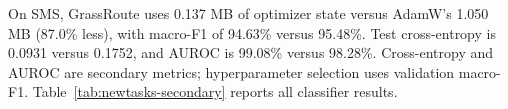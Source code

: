 On SMS, GrassRoute uses 0.137 MB of optimizer state versus AdamW's 1.050 MB
(87.0\% less), with macro-F1 of 94.63\% versus 95.48\%. Test cross-entropy
is 0.0931 versus 0.1752, and AUROC is 99.08\% versus 98.28\%. Cross-entropy
and AUROC are secondary metrics; hyperparameter selection uses validation
macro-F1. Table~\ref{tab:newtasks-secondary} reports all classifier results.
